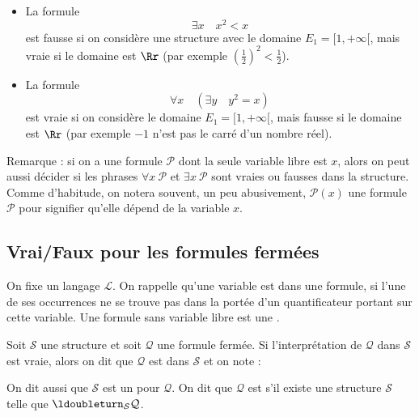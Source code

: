 \documentclass[11pt,class=report,crop=false]{standalone}
\begin{document}
\begin{exemple}
	\sauteligne
	\begin{itemize}
		\item La formule 
		\[\exists x \quad x^2 < x\]
		est fausse si on considère une structure avec le domaine $E_1 = [1,+\infty[$,
		mais vraie si le domaine est $\Rr$ (par exemple $(\frac12)^2 < \frac12$).
		
	
		\item La formule 
		\[\forall x \quad (\exists y \quad y^2 = x)\]
		est vraie si on considère le domaine $E_1 = [1,+\infty[$,
		mais fausse si le domaine est $\Rr$ (par exemple $-1$ n'est pas le carré d'un nombre réel).
	\end{itemize}
\end{exemple}


Remarque : si on a une formule $\mathcal{P}$ dont la seule variable libre est $x$, alors on peut aussi décider si les phrases 
\og{}$\forall x \ \mathcal{P}$\fg{}
et \og{}$\exists x \ \mathcal{P}$\fg{} sont vraies ou fausses dans la structure.
Comme d'habitude, on notera souvent, un peu abusivement, $\mathcal{P}(x)$ une formule $\mathcal{P}$ pour signifier qu'elle dépend de la variable $x$. 

\subsection{Vrai/Faux pour les formules fermées}

On fixe un langage $\mathcal{L}$.
On rappelle qu'une variable est  dans une formule, si l'une de ses occurrences ne se trouve pas dans la portée d'un quantificateur portant sur cette variable. Une formule sans variable libre est une .

\begin{definition}
Soit $\mathcal{S}$ une structure et soit $\mathcal{Q}$ une formule fermée. Si l'interprétation de $\mathcal{Q}$ dans $\mathcal{S}$ est vraie, alors on dit que $\mathcal{Q}$ est  dans $\mathcal{S}$ et on note :
\end{definition}

On dit aussi que $\mathcal{S}$ est un  pour $\mathcal{Q}$.
On dit que $\mathcal{Q}$ est  s'il existe une structure $\mathcal{S}$ telle que $\ldoubleturn_{\mathcal{S}} \mathcal{Q}$.
\end{document}
